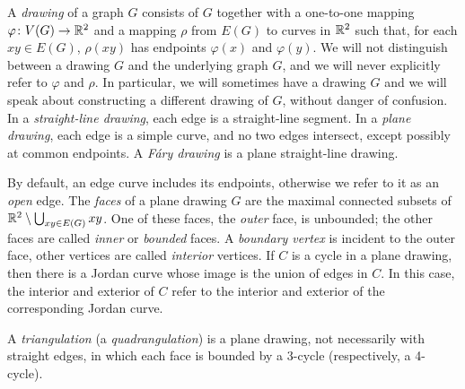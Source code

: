A \emph{drawing} %
of a graph $G$ consists of $G$ together with
 a one-to-one mapping $\varphi\colon V(G)\to\mathbb{R}^2$ and a mapping $\rho$ from
$E(G)$ to curves in $\mathbb{R}^2$ such that, for each $xy\in E(G)$, $\rho(xy)$
has endpoints $\varphi(x)$ and $\varphi(y)$.
We will not distinguish between a drawing $G$ and the underlying graph
$G$, and we will never
explicitly refer to $\varphi$ and $\rho$.
In particular, we will sometimes have a drawing $G$ and we will speak about constructing
a different drawing of $G$, without danger of confusion.
%
In a \emph{straight-line drawing}, each edge is a straight-line
segment. In a \emph{plane drawing}, each edge is a simple curve, and no
two edges intersect, except possibly at common endpoints. A
\emph{F\'ary drawing} is a plane straight-line drawing.

By default, an edge curve includes
its endpoints, otherwise we refer to it as an \emph{open} edge.
%
The \emph{faces} of a plane drawing $G$ are the maximal connected
subsets of $\mathbb{R}^2\setminus\bigcup_{xy\in E(G)} xy$.  One of
these faces, the \emph{outer} face, is unbounded; the other faces are called \emph{inner} or \emph{bounded} faces. A {\em boundary vertex} is incident to the outer face, other vertices are called \emph{interior} vertices.
 If
 $C$ is a
cycle %
 in a plane drawing, then
 there is a 
Jordan curve whose image
is the union of edges in $C$.  In this case, the interior and exterior of
$C$ refer to the interior and exterior of the corresponding Jordan curve.

A \emph{triangulation} (a \emph{quadrangulation}) is a plane drawing,
not necessarily with straight edges,
in which each face is bounded by a 3-cycle (respectively, a 4-cycle). 

